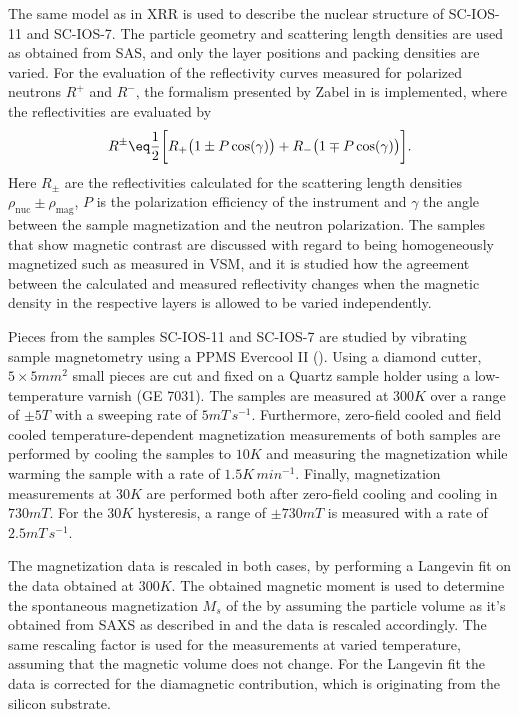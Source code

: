 \documentclass[\main/dresen_thesis.tex]{subfiles}
\begin{document}
    The same model as in XRR is used to describe the nuclear structure of SC-IOS-11 and SC-IOS-7.
    The particle geometry and scattering length densities are used as obtained from SAS, and only the layer positions and packing densities are varied.
    For the evaluation of the reflectivity curves measured for polarized neutrons $R^{+}$ and $R^{-}$, the formalism presented by Zabel \etal in \cite{Kronmueller_2007_Handb} is implemented, where the reflectivities are evaluated by
    \begin{align}
      \label{eq:looselyPackedNP:pnrReflectivityFormula}
      R^\pm \eq \frac{1}{2} \biggl[ R_{+} \bigl(1 \pm P \cos(\gamma) \bigr) + R_{-} \bigl(1 \mp P \cos(\gamma) \bigr) \biggr].
    \end{align}
    Here $R_\pm$ are the reflectivities calculated for the scattering length densities $\rho_\mathrm{nuc} \pm \rho_\mathrm{mag}$, $P$ is the polarization efficiency of the instrument and $\gamma$ the angle between the sample magnetization and the neutron polarization.
    The samples that show magnetic contrast are discussed with regard to being homogeneously magnetized such as measured in VSM, and it is studied how the agreement between the calculated and measured reflectivity changes when the magnetic density in the respective layers is allowed to be varied independently.

    Pieces from the samples SC-IOS-11 and SC-IOS-7 are studied by vibrating sample magnetometry using a PPMS Evercool II ().
    Using a diamond cutter, $5 \times 5 \unit{mm^2}$ small pieces are cut and fixed on a Quartz sample holder using a low-temperature varnish (GE 7031).
    The samples are measured at $300 \unit{K}$ over a range of $\pm 5 \unit{T}$ with a sweeping rate of $5 \unit{mT \, s^{-1}}$.
    Furthermore, zero-field cooled and field cooled temperature-dependent magnetization measurements of both samples are performed by cooling the samples to $10 \unit{K}$ and measuring the magnetization while warming the sample with a rate of $1.5 \unit{K \, min^{-1}}$.
    Finally, magnetization measurements at $30 \unit{K}$ are performed both after zero-field cooling and cooling in $730 \unit{mT}$.
    For the $30 \unit{K}$ hysteresis, a range of $\pm 730 \unit{mT}$ is measured with a rate of $2.5 \unit{mT \, s^{-1}}$.

    The magnetization data is rescaled in both cases, by performing a Langevin fit on the data obtained at $300 \unit{K}$.
    The obtained magnetic moment is used to determine the spontaneous magnetization $M_s$ of the by assuming the particle volume as it's obtained from SAXS as described in  and the data is rescaled accordingly.
    The same rescaling factor is used for the measurements at varied temperature, assuming that the magnetic volume does not change.
    For the Langevin fit the data is corrected for the diamagnetic contribution, which is originating from the silicon substrate.
\end{document}
